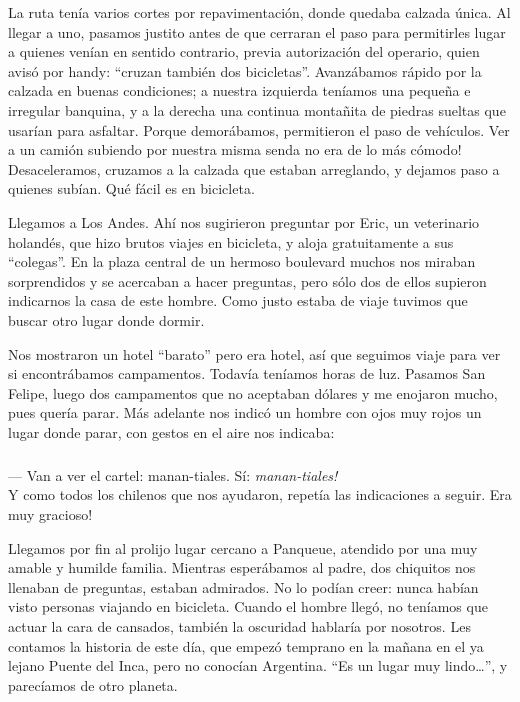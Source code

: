 La ruta ten\'ia varios cortes por repavimentaci\'on, donde quedaba calzada
\'unica. Al llegar a uno, pasamos justito antes de que cerraran el paso para
permitirles lugar a quienes ven\'ian en sentido contrario, previa autorizaci\'on
del operario, quien avis\'o por handy: ``cruzan tambi\'en dos bicicletas''.
Avanz\'abamos r\'apido por la calzada en buenas condiciones; a nuestra izquierda
ten\'iamos una peque\~na e irregular banquina, y a la derecha una continua
monta\~nita de piedras sueltas que usar\'ian para asfaltar. Porque
demor\'abamos, permitieron el paso de veh\'iculos. \textexclamdown Ver a un
cami\'on subiendo por nuestra misma senda no era de lo m\'as c\'omodo!
Desaceleramos, cruzamos a la calzada que estaban arreglando, y dejamos paso a
quienes sub\'ian. Qu\'e f\'acil es en bicicleta.

Llegamos a Los Andes. Ah\'i nos sugirieron preguntar por Eric, un veterinario
holand\'es, que hizo brutos viajes en bicicleta, y aloja gratuitamente a sus
``colegas''. En la plaza central de un hermoso boulevard muchos nos miraban
sorprendidos y se acercaban a hacer preguntas, pero s\'olo dos de ellos supieron
indicarnos la casa de este hombre. Como justo estaba de viaje tuvimos que buscar
otro lugar donde dormir.

Nos mostraron un hotel ``barato'' pero era hotel, as\'i que seguimos viaje para
ver si encontr\'abamos campamentos. Todav\'ia ten\'iamos horas de luz. Pasamos
San Felipe, luego dos campamentos que no aceptaban d\'olares y me enojaron
mucho, pues quer\'ia parar. M\'as adelante nos indic\'o un hombre con ojos muy
rojos un lugar donde parar, con gestos en el aire nos indicaba:

\subparagraph{}\label{ssub:manan-tiales}
--- Van a ver el cartel: manan-tiales. S\'i: \emph{\textexclamdown
manan-tiales!}\\

Y como todos los chilenos que nos ayudaron, repet\'ia las indicaciones a seguir.
\textexclamdown Era muy gracioso!

Llegamos por fin al prolijo lugar cercano a Panqueue, atendido por una muy
amable y humilde familia. Mientras esper\'abamos al padre, dos chiquitos nos
llenaban de preguntas, estaban admirados. No lo pod\'ian creer: nunca hab\'ian
visto personas viajando en bicicleta. Cuando el hombre lleg\'o, no ten\'iamos
que actuar la cara de cansados, tambi\'en la oscuridad hablar\'ia por nosotros.
Les contamos la historia de este d\'ia, que empez\'o temprano en la ma\~nana en
el ya lejano Puente del Inca, pero no conoc\'ian Argentina. ``Es un lugar muy
lindo\ldots'', y parec\'iamos de otro planeta.

